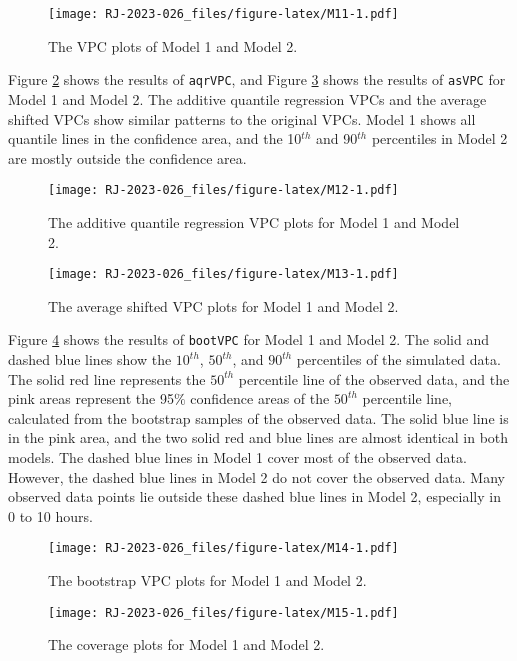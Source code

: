 \begin{figure}
\centering
\texttt{[image: RJ-2023-026\_files/figure-latex/M11-1.pdf]}
\caption{\label{fig:M11}The VPC plots of Model 1 and Model 2.}
\end{figure}

Figure \ref{fig:M12} shows the results of \texttt{aqrVPC}, and Figure \ref{fig:M13} shows the results of \texttt{asVPC} for Model 1 and Model 2. The additive quantile regression VPCs and the average shifted VPCs show similar patterns to the original VPCs. Model 1 shows all quantile lines in the confidence area, and the 10\(^{th}\) and 90\(^{th}\) percentiles in Model 2 are mostly outside the confidence area.

\begin{figure}
\centering
\texttt{[image: RJ-2023-026\_files/figure-latex/M12-1.pdf]}
\caption{\label{fig:M12}The additive quantile regression VPC plots for Model 1 and Model 2.}
\end{figure}

\begin{figure}
\centering
\texttt{[image: RJ-2023-026\_files/figure-latex/M13-1.pdf]}
\caption{\label{fig:M13}The average shifted VPC plots for Model 1 and Model 2.}
\end{figure}

Figure \ref{fig:M14} shows the results of \texttt{bootVPC} for Model 1 and Model 2. The solid and dashed blue lines show the \(10^{th}\), \(50^{th}\), and \(90^{th}\) percentiles of the simulated data. The solid red line represents the \(50^{th}\) percentile line of the observed data, and the pink areas represent the 95\(\%\) confidence areas of the \(50^{th}\) percentile line, calculated from the bootstrap samples of the observed data.
The solid blue line is in the pink area, and the two solid red and blue lines are almost identical in both models.
The dashed blue lines in Model 1 cover most of the observed data. However, the dashed blue lines in Model 2 do not cover the observed data. Many observed data points lie outside these dashed blue lines in Model 2, especially in 0 to 10 hours.

\begin{figure}
\centering
\texttt{[image: RJ-2023-026\_files/figure-latex/M14-1.pdf]}
\caption{\label{fig:M14}The bootstrap VPC plots for Model 1 and Model 2.}
\end{figure}

\begin{figure}
\centering
\texttt{[image: RJ-2023-026\_files/figure-latex/M15-1.pdf]}
\caption{\label{fig:M15}The coverage plots for Model 1 and Model 2.}
\end{figure}

